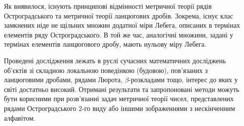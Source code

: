 Як виявилося, існують принципові відмінності метричної теорії
рядів Остроградського та метричної теорії ланцюгових дробів.
Зокрема, існує клас замкнених ніде не щільних множин додатної міри
Лебега, описаних в термінах елементів ряду Остроградського. В той
же час, аналогічні множини, задані у термінах елементів
ланцюгового дробу, мають нульову міру Лебега.

Проведені дослідження лежать в руслі сучасних математичних
досліджень об'єктів зі складною локальною поведінкою (будовою),
пов'язаних з ланцюговими дробами, рядами Люрота,
$\beta$-розкладами тощо, інтерес до яких у світі достатньо
високий. Отримані результати та запропоновані методи можуть бути
корисними при розв'язанні задач метричної теорії чисел,
представлених рядами Остроградського $2$-го виду або іншими
зображеннями з нескінченним алфавітом.
